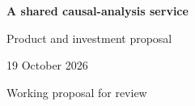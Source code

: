 \documentclass[11pt,a4paper]{article}
\begin{document}
\begin{center}{\LARGE\bfseries A shared causal-analysis service\par}\vspace{3mm}
{\large Product and investment proposal\par}\vspace{2mm}
19 October 2026\par Working proposal for review
\end{center}

\clearpage


\end{document}
